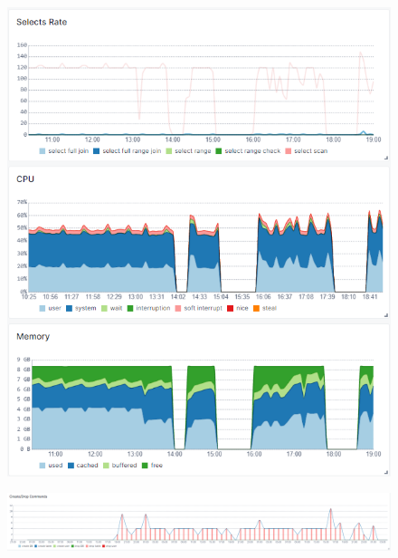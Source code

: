 \begin{figure}
    \centering
    \includegraphics[width=\textwidth]{figures/mysql_performance.png}
    \caption{}
    \label{fig:mysql_performance}
\end{figure}

\begin{figure}
    \centering
    \includegraphics[width=\textwidth]{figures/mysql_create_drop.png}
    \caption{}
    \label{fig:mysql_create_drop}
\end{figure}


